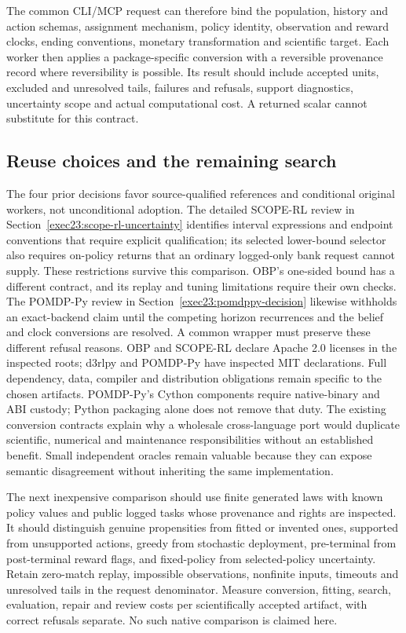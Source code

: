 The common CLI/MCP request can therefore bind the population, history and action
schemas, assignment mechanism, policy identity, observation and reward clocks,
ending conventions, monetary transformation and scientific target. Each worker
then applies a package-specific conversion with a reversible provenance record
where reversibility is possible. Its result should include accepted units,
excluded and unresolved tails, failures and refusals, support diagnostics,
uncertainty scope and actual computational cost. A returned scalar cannot
substitute for this contract.

\subsection{Reuse choices and the remaining search}

The four prior decisions favor source-qualified references and conditional
original workers, not unconditional adoption. The detailed SCOPE-RL review
in Section~\ref{exec23:scope-rl-uncertainty} identifies interval expressions
and endpoint conventions that require explicit qualification; its selected
lower-bound selector also requires on-policy returns that an ordinary
logged-only bank request cannot supply. These restrictions survive this
comparison. OBP's one-sided bound has a different contract, and its replay
and tuning limitations require their own checks. The POMDP-Py review in
Section~\ref{exec23:pomdppy-decision} likewise withholds an exact-backend claim
until the competing horizon recurrences and the belief and clock conversions
are resolved. A common wrapper must preserve these different refusal reasons. OBP and SCOPE-RL declare Apache
2.0 licenses in the inspected roots; d3rlpy and POMDP-Py have inspected MIT
declarations. Full dependency, data, compiler and distribution obligations
remain specific to the chosen artifacts. POMDP-Py's Cython components require
native-binary and ABI custody; Python packaging alone does not remove that duty.
The existing conversion contracts explain why a wholesale cross-language port
would duplicate scientific, numerical and maintenance responsibilities without
an established benefit. Small independent oracles remain valuable because they
can expose semantic disagreement without inheriting the same implementation.
\citep{exec23_obp_sources,exec23_scope_rl_sources,exec15_d3rlpy_package,
exec15_d3rlpy_contract,exec23_pomdppy_sources}

The next inexpensive comparison should use finite generated laws with known
policy values and public logged tasks whose provenance and rights are inspected.
It should distinguish genuine propensities from fitted or invented ones, supported
from unsupported actions, greedy from stochastic deployment, pre-terminal from
post-terminal reward flags, and fixed-policy from selected-policy uncertainty.
Retain zero-match replay, impossible observations, nonfinite inputs, timeouts
and unresolved tails in the request denominator. Measure conversion, fitting,
search, evaluation, repair and review costs per scientifically accepted artifact,
with correct refusals separate. No such native comparison is claimed here.

